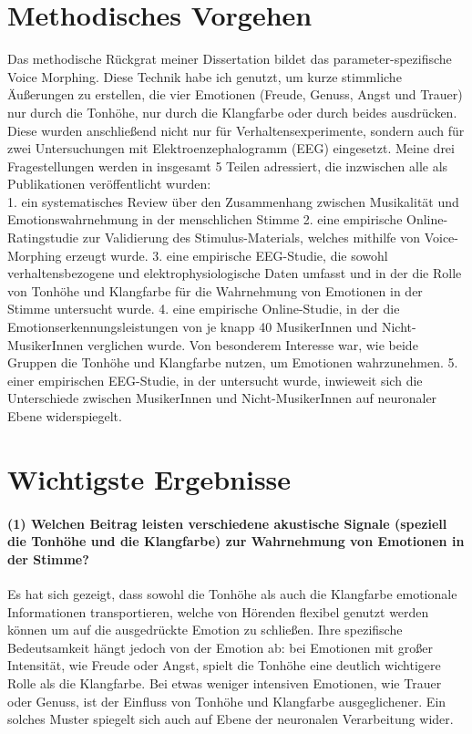 \documentclass[11pt,a4paper,sans]{moderncv} %
\begin{document}
\section{Methodisches Vorgehen}

Das methodische Rückgrat meiner Dissertation bildet das parameter-spezifische Voice Morphing. Diese Technik habe ich genutzt, um kurze stimmliche Äußerungen zu erstellen, die vier Emotionen (Freude, Genuss, Angst und Trauer) nur durch die Tonhöhe, nur durch die Klangfarbe oder durch beides ausdrücken. Diese wurden anschließend nicht nur für Verhaltensexperimente, sondern auch für zwei Untersuchungen mit Elektroenzephalogramm (EEG) eingesetzt. 
Meine drei Fragestellungen werden in insgesamt 5 Teilen adressiert, die inzwischen alle als Publikationen veröffentlicht wurden: \\

1.	ein systematisches Review über den Zusammenhang zwischen Musikalität und Emotionswahrnehmung in der menschlichen Stimme 
2.	eine empirische Online-Ratingstudie zur Validierung des Stimulus-Materials, welches mithilfe von Voice-Morphing erzeugt wurde. 
3.	eine empirische EEG-Studie, die sowohl verhaltensbezogene und elektrophysiologische Daten umfasst und in der die Rolle von Tonhöhe und Klangfarbe für die Wahrnehmung von Emotionen in der Stimme untersucht wurde. 
4.	eine empirische Online-Studie, in der die Emotionserkennungsleistungen von je knapp 40 MusikerInnen und Nicht-MusikerInnen verglichen wurde. Von besonderem Interesse war, wie beide Gruppen die Tonhöhe und Klangfarbe nutzen, um Emotionen wahrzunehmen.
5.	einer empirischen EEG-Studie, in der untersucht wurde, inwieweit sich die Unterschiede zwischen MusikerInnen und Nicht-MusikerInnen auf neuronaler Ebene widerspiegelt. 

\section{Wichtigste Ergebnisse}

\paragraph{(1)	Welchen Beitrag leisten verschiedene akustische Signale (speziell die Tonhöhe und die Klangfarbe) zur Wahrnehmung von Emotionen in der Stimme?}

Es hat sich gezeigt, dass sowohl die Tonhöhe als auch die Klangfarbe emotionale Informationen transportieren, welche von Hörenden flexibel genutzt werden können um auf die ausgedrückte Emotion zu schließen.  Ihre spezifische Bedeutsamkeit hängt jedoch von der Emotion ab: bei Emotionen mit großer Intensität, wie Freude oder Angst, spielt die Tonhöhe eine deutlich wichtigere Rolle als die Klangfarbe. Bei etwas weniger intensiven Emotionen, wie Trauer oder Genuss, ist der Einfluss von Tonhöhe und Klangfarbe ausgeglichener. Ein solches Muster spiegelt sich auch auf Ebene der neuronalen Verarbeitung wider. 
\end{document}
